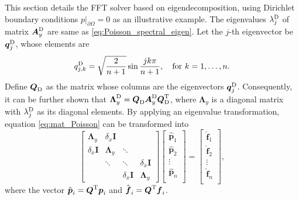 \documentclass[preprint]{elsarticle}
\begin{document}
This section details the FFT solver based on eigendecomposition, using Dirichlet boundary conditions $\left.p\right|_{\partial\Omega}=0$ as an illustrative example. The eigenvalues $\lambda_j^{\rm D}$ of matrix $\boldsymbol{A}_y^{\rm D}$ are same as \eqref{eq:Poisson_spectral_eigen}. Let the $j$-th eigenvector be $\boldsymbol{q}^{\rm D}_{j}$, whose elements are
\begin{equation}
    \label{eq:eigvector_Diri}
    {q}^{\rm D}_{j,k}=\sqrt{\frac{2}{n+1}}\sin{\dfrac{jk\pi}{n+1}},\quad \text{for } k={1, \dots, n}.
\end{equation}
Define $\boldsymbol{Q}_{\rm D}$ as the matrix whose columns are the eigenvectors $\boldsymbol{q}^{\rm D}_{j}$. Consequently, it can be further shown that $\boldsymbol{\Lambda}_y^{\rm D}=\boldsymbol{Q}_{\rm D}\boldsymbol{A}_y^{\rm D}\boldsymbol{Q}_{\rm D}^{\rm T}$, where $\boldsymbol{\Lambda}_y$ is a diagonal matrix with $\lambda_j^{\rm D}$ as its diagonal elements. By applying an eigenvalue transformation, equation \eqref{eq:mat_Poisson} can be transformed into
\begin{equation}
    \label{eq:eigen_trans}
    \left[\begin{matrix}
        \boldsymbol{\Lambda}_y & \delta_x\boldsymbol{I} \\
        \delta_x\boldsymbol{I} & \boldsymbol{\Lambda}_y & \ddots\\
        & \ddots & \ddots & \delta_x\boldsymbol{I}\\
        & & \delta_x\boldsymbol{I} & \boldsymbol{\Lambda}_y
    \end{matrix}\right]
    \left[\begin{matrix}
        \hat{\boldsymbol{p}}_{1}\\
        \hat{\boldsymbol{p}}_{2}\\
        \vdots\\
        \hat{\boldsymbol{p}}_{n}\\
    \end{matrix}\right]
    =
    \left[\begin{matrix}
        \hat{\boldsymbol{f}}_{1}\\
        \hat{\boldsymbol{f}}_{2}\\
        \vdots\\
        \hat{\boldsymbol{f}}_{n}\\
    \end{matrix}\right],
\end{equation}
where the vector $\hat{\boldsymbol{p}}_i=\boldsymbol{Q}^{\rm T}\boldsymbol{p}_i$ and $\hat{\boldsymbol{f}}_i=\boldsymbol{Q}^{\rm T}\boldsymbol{f}_i$.\par
\end{document}
